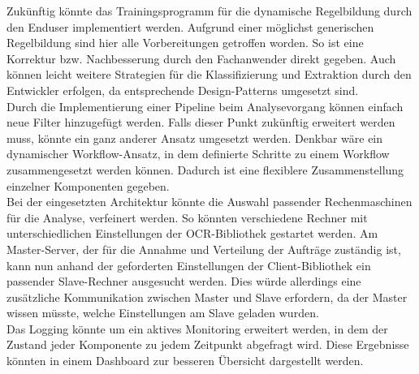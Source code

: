 Zukünftig könnte das Trainingsprogramm für die dynamische Regelbildung durch den Enduser implementiert werden. Aufgrund einer möglichst generischen Regelbildung sind hier alle Vorbereitungen getroffen worden. So ist eine Korrektur bzw. Nachbesserung durch den Fachanwender direkt gegeben. Auch können leicht weitere Strategien für die Klassifizierung und Extraktion durch den Entwickler erfolgen, da entsprechende Design-Patterns umgesetzt sind.\\
Durch die Implementierung einer Pipeline beim Analysevorgang können einfach neue Filter hinzugefügt werden. Falls dieser Punkt zukünftig erweitert werden muss, könnte ein ganz anderer Ansatz umgesetzt werden. Denkbar wäre ein dynamischer Workflow-Ansatz, in dem definierte Schritte zu einem Workflow zusammengesetzt werden können. Dadurch ist eine flexiblere Zusammenstellung einzelner Komponenten gegeben.\\
Bei der eingesetzten Architektur könnte die Auswahl passender Rechenmaschinen für die Analyse, verfeinert werden. So könnten verschiedene Rechner mit unterschiedlichen Einstellungen der \ac{OCR}-Bibliothek gestartet werden. Am Master-Server, der für die Annahme und Verteilung der Aufträge zuständig ist, kann nun anhand der geforderten Einstellungen der Client-Bibliothek ein passender Slave-Rechner ausgesucht werden. Dies würde allerdings eine zusätzliche Kommunikation zwischen Master und Slave erfordern, da der Master wissen müsste, welche Einstellungen am Slave geladen wurden.\\
Das Logging könnte um ein aktives Monitoring erweitert werden, in dem der Zustand jeder Komponente zu jedem Zeitpunkt abgefragt wird. Diese Ergebnisse könnten in einem Dashboard zur besseren Übersicht dargestellt werden.

